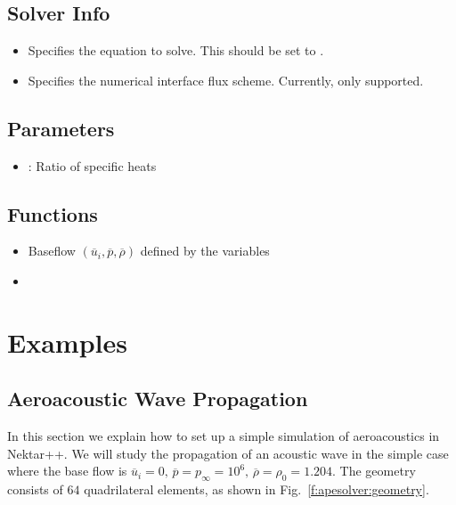 \subsection{Solver Info}
\begin{itemize}
\item {} Specifies the equation to solve. This should be set to
.
\item {} Specifies the numerical interface flux scheme.
Currently, only  supported.
\end{itemize}

\subsection{Parameters}
\begin{itemize}
\item {}: Ratio of specific heats
\end{itemize}

\subsection{Functions}
\begin{itemize}
\item {} Baseflow $(\overline{u}_i, \overline{p}, \overline{\rho})$ defined by the variables 
\item {}
\end{itemize}


\section{Examples}
\subsection{Aeroacoustic Wave Propagation}
In this section we explain how to set up a simple simulation of aeroacoustics in
Nektar++. We will study the propagation of an acoustic wave in the simple case
where the base flow is $\overline{u}_i = 0, \, \overline{p}=p_{\infty}=10^6, \, \overline{\rho} = \rho_0 = 1.204$. The geometry consists
of $64$ quadrilateral elements, as shown in Fig.~\ref{f:apesolver:geometry}.

